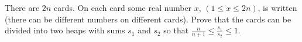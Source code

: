 There are $2n$ cards. On each card some real number $x$,  $(1\le x\le 2n)$,  is written (there can be different numbers on different cards). Prove that the cards can be divided into two heaps with sums $s_1$ and $s_2$ so that $\frac{n}{n+1}\le\frac{s_1}{s_2}\le 1$.